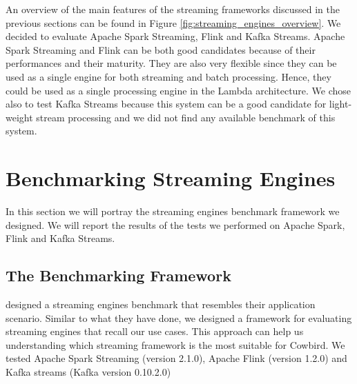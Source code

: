 An overview of the main features of the streaming frameworks discussed in the previous sections can be found in Figure \ref{fig:streaming_engines_overview}. We decided to evaluate Apache Spark Streaming, Flink and Kafka Streams. 
Apache Spark Streaming and Flink can be both good candidates because of their performances \cite{streamprocessingcomparison, yahoobenchmarkingonline, zalandobenchmarkingonline} and their maturity. They are also very flexible since they can be used as a single engine for both streaming and batch processing. Hence, they could be used as a single processing engine in the Lambda architecture. We chose also to test Kafka Streams because this system can be a good candidate for light-weight stream processing and we did not find any available benchmark of this system. 

\section{Benchmarking Streaming Engines}
In this section we will portray the streaming engines benchmark framework we designed. We will report the results of the tests we performed on Apache Spark, Flink and Kafka Streams.
\subsection{The Benchmarking Framework}
\cite{yahoobenchmarkingonline, zalandobenchmarkingonline} designed a streaming engines benchmark that resembles their application scenario. Similar to what they have done, we designed a framework for evaluating streaming engines that recall our use cases. This approach can help us understanding which streaming framework is the most suitable for Cowbird. We tested Apache Spark Streaming (version 2.1.0), Apache Flink (version 1.2.0) and Kafka streams (Kafka version 0.10.2.0)

